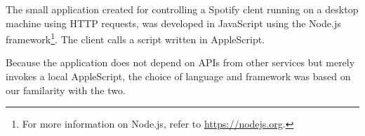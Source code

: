 The small application created for controlling a Spotify clent running on a desktop machine using HTTP requests, was developed in JavaScript using the Node.js framework\footnote{For more information on Node.js, refer to \url{https://nodejs.org}.}. The client calls a script written in AppleScript.

Because the application does not depend on APIs from other services but merely invokes a local AppleScript, the choice of language and framework was based on our familarity with the two.

